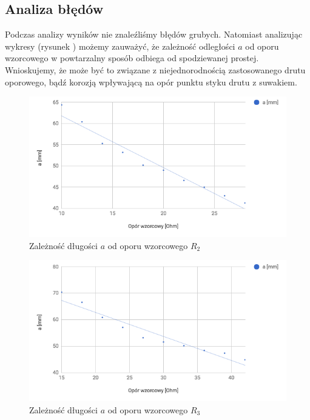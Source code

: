 \documentclass[a4paper,10pt,twoside]{article}
\begin{document}
\subsection{Analiza błędów}

Podczas analizy wyników nie znaleźliśmy błędów grubych. Natomiast analizując wykresy (rysunek ) możemy zauważyć, że zależność odległości $a$ od oporu wzorcowego w powtarzalny sposób odbiega od spodziewanej prostej. Wnioskujemy, że może być to związane z niejednorodnością zastosowanego drutu oporowego, bądź korozją wpływającą na opór punktu styku drutu z suwakiem.

\begin{figure}[!htp]
\centerline{\includegraphics[scale=0.5]{wykres_r2.png}}
\caption{Zależność długości $a$ od oporu wzorcowego $R_2$}
\label{fig:wykres_r2}
\end{figure}

\begin{figure}[!htp]
\centerline{\includegraphics[scale=0.5]{wykres_r3.png}}
\caption{Zależność długości $a$ od oporu wzorcowego $R_3$}
\label{fig:wykres_r3}
\end{figure}
\end{document}

